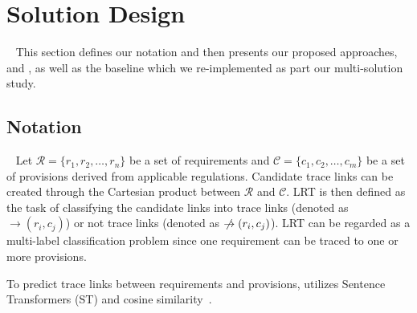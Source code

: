 \section{Solution Design}~\label{sec:approach}
This section defines our notation and then presents our proposed approaches, \kashif and \RICE, as well as the baseline which we re-implemented as part our multi-solution study.

\subsection{Notation}~\label{subsec:def}
Let $\mathcal{R}=\{r_1, r_2, \ldots, r_n\}$ be a set of requirements and $\mathcal{C}=\{c_1, c_2, \ldots, c_m\}$ be a set of provisions derived from applicable regulations. 
Candidate trace links can be created through the Cartesian product between $\mathcal{R}$ and $\mathcal{C}$. 
LRT is then defined as the task of classifying the candidate links into trace links (denoted as $\rightarrow(r_i, c_j)$) or not trace links (denoted as $\centernot\rightarrow(r_i, c_j)$). 
LRT can be regarded as a multi-label classification problem since one requirement can be traced to one or more provisions. 



To predict trace links between requirements and provisions, \kashif utilizes Sentence Transformers (ST) and cosine similarity~\cite{Manning:08}.  
%

